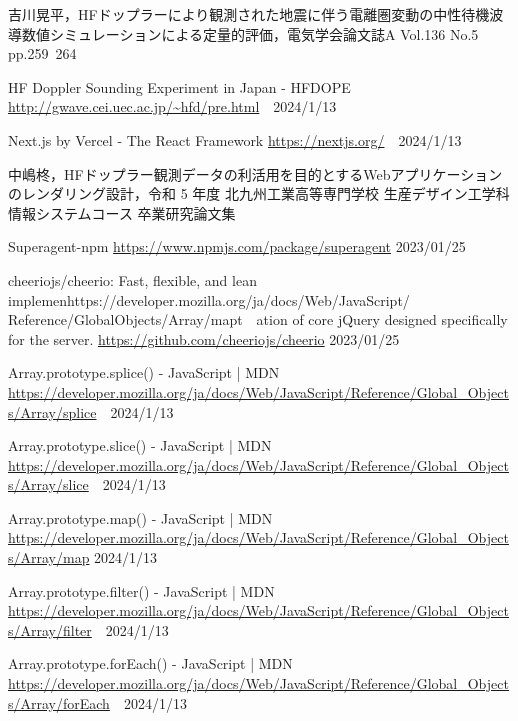 \small
\begin{thebibliography}{99}
\setlength{\itemsep}{0pt}
\smallskip

吉川晃平，HFドップラーにより観測された地震に伴う電離圏変動の中性待機波導数値シミュレーションによる定量的評価，電気学会論文誌A Vol.136 No.5 pp.259~264

HF Doppler Sounding Experiment in Japan - HFDOPE
\url{http://gwave.cei.uec.ac.jp/~hfd/pre.html}　2024/1/13

Next.js by Vercel - The React Framework
\url{https://nextjs.org/}　2024/1/13

中嶋柊，HFドップラー観測データの利活用を目的とするWebアプリケーションのレンダリング設計，令和 5 年度 北九州工業高等専門学校 生産デザイン工学科 情報システムコース 卒業研究論文集

Superagent-npm 
\url{https://www.npmjs.com/package/superagent}  2023/01/25

cheeriojs/cheerio: Fast, flexible, and lean implemenhttps://developer.mozilla.org/ja/docs/Web/JavaScript/
Reference/GlobalObjects/Array/mapt　ation of core jQuery designed specifically for the server. 
\url{https://github.com/cheeriojs/cheerio}  2023/01/25 

Array.prototype.splice() - JavaScript | MDN
\url{https://developer.mozilla.org/ja/docs/Web/JavaScript/Reference/Global_Objects/Array/splice}　2024/1/13

Array.prototype.slice() - JavaScript | MDN
\url{https://developer.mozilla.org/ja/docs/Web/JavaScript/Reference/Global_Objects/Array/slice}　2024/1/13

Array.prototype.map() - JavaScript | MDN
\url{https://developer.mozilla.org/ja/docs/Web/JavaScript/Reference/Global_Objects/Array/map}
2024/1/13

Array.prototype.filter() - JavaScript | MDN
\url{https://developer.mozilla.org/ja/docs/Web/JavaScript/Reference/Global_Objects/Array/filter}　2024/1/13

Array.prototype.forEach() - JavaScript | MDN
\url{https://developer.mozilla.org/ja/docs/Web/JavaScript/Reference/Global_Objects/Array/forEach}　2024/1/13

\end{thebibliography}
\normalsize

